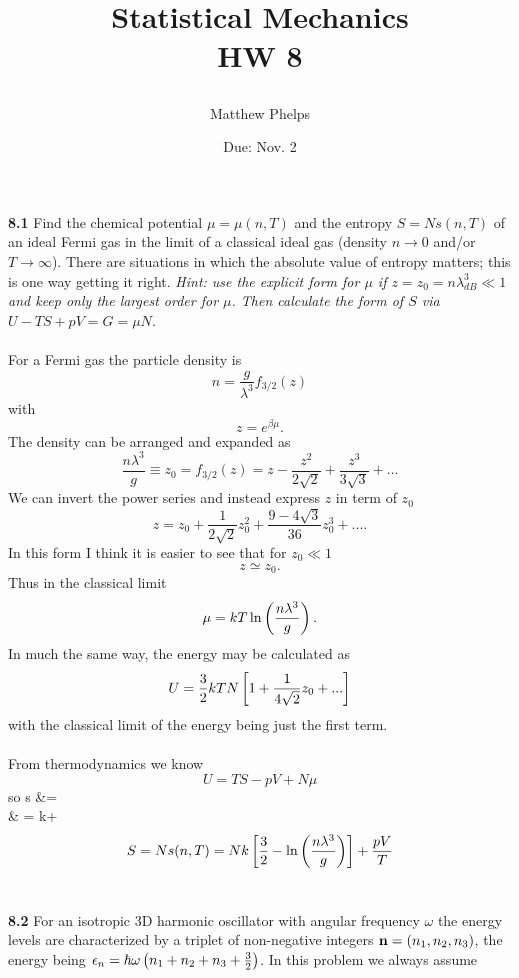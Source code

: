 \documentclass[11pt,letterpaper]{article}
\title{\begin{spacing}{1.2}Statistical Mechanics\\HW 8\end{spacing}}
\author{Matthew Phelps}
\date{Due: Nov. 2}
\begin{document}
\maketitle

\benum
  	\item[\textbf{8.1}]
	Find the chemical potential $\mu = \mu(n,T)$ and the entropy $S=Ns(n,T)$ of an ideal
	Fermi gas in the limit of a classical ideal gas (density $n\to 0$ and/or $T\to \infty$). There are
	situations in which the absolute value of entropy matters; this is one way getting it right.
	\emph{Hint: use the explicit form for $\mu$ if $z=z_0=n\lambda_{dB}^3\ll 1$ and keep only
	the largest order for $\mu$. Then calculate the form of $S$ via $U-TS+pV = G=\mu N$.} 
	\\
	\\
	For a Fermi gas the particle density is
	\[
		n = \frac{g}{\lambda^3}f_{3/2}(z)
	\]
	with
	\[
		z = 	e^{\beta\mu}.
	\]
	The density can be arranged and expanded as
	\[
		\frac{n\lambda^3}{g} \equiv z_0 =  f_{3/2}(z) = z- \frac{z^2}{2\sqrt 2}+\frac{z^3}{3\sqrt 3}+...
	\]
	We can invert the power series and instead express $z$ in term of $z_0$
	\[
		z = z_0+\frac{1}{2\sqrt 2}z_0^2+\frac{9-4\sqrt 3}{36}z_0^3+....
	\]
	In this form I think it is easier to see that for $z_0\ll 1$
	\[
		z\simeq z_0.
	\]
	Thus in the classical limit
	\[
		\mu = kT\ln\left(\frac{n\lambda^3}{g}\right).
	\]
	In much the same way, the energy may be calculated as
	\[
		U = \frac{3}{2}kTN\left[1+\frac{1}{4\sqrt 2}z_0+...\right]
	\]
	with the classical limit of the energy being just the first term.
	\\
	\\
	From thermodynamics we know
	\[
		U = TS-pV+N\mu 
	\]
	so
	\ba
		s &= \\
		& = k+
	\ea
	\[
		S = Ns(n,T) = N k\left[\frac{3}{2}-\ln\left(\frac{n\lambda^3}{g}\right)\right]+\frac{pV}{T}
	\]
	\\
	\item[\textbf{8.2}]
	For an isotropic 3D harmonic oscillator with angular frequency $\omega$ the energy levels are
	characterized by a triplet of non-negative integers $\mathbf{n} = (n_1,n_2,n_3)$, the energy
	being $\epsilon_n = \hbar\omega\left(n_1+n_2+n_3+\frac{3}{2}\right)$. In this problem we always assume
\end{document}
